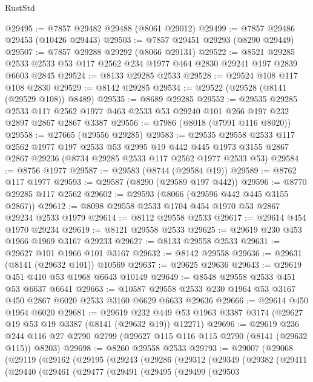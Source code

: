 \begin{lexlean}{RustStd}
\begin{coremodule}
@29495 := @7857 @29482 @29488 (@8061 @29012)
@29499 := @7857 @29486 @29453 (@10426 @29443)
@29503 := @7857 @29451 @29293 (@8290 @29449)
@29507 := @7857 @29288 @29292 (@8066 @29131)
@29522 := @8521
    @29285
    @2533
    @2533
    @53
    @117
    @2562
    @234
    @1977
    @464
    @2830
    @29241
    @197
    @2839
    @6603
    @2845
@29524 := @8133 @29285 @2533
@29528 := @29524 @108 @117 @108 @2830
@29529 := @8142 @29285
@29534 := @29522 (@29528 (@8141 (@29529 @108)) @8489)
@29535 := @8689 @29285
@29552 := @29535
    @29285
    @2533
    @117
    @2562
    @1977
    @463
    @2533
    @53
    @29240
    @101
    @266
    @197
    @232
    @2897
    @2867
    @2867
    @3387
@29556 := @7986 (@8018 (@7991 @116 @8020))
@29558 := @27665 (@29556 @29285)
@29583 := @29535
    @29558
    @2533
    @117
    @2562
    @1977
    @197
    @2533
    @53
    @2995
    @19
    @442
    @445
    @1973
    @3155
    @2867
    @2867
    @29236
    (@8734 @29285 @2533 @117 @2562 @1977 @2533 @53)
@29584 := @8756 @1977
@29587 := @29583 (@8744 (@29584 @19))
@29589 := @8762 @117 @1977
@29593 := @29587 (@8290 (@29589 @197 @442))
@29596 := @8770 @29285 @117 @2562
@29602 := @29593 (@8066 (@29596 @442 @445 @3155 @2867))
@29612 := @8098 @29558 @2533 @1704 @454 @1970 @53 @2867 @29234 @2533 @1979
@29614 := @8112 @29558 @2533
@29617 := @29614 @454 @1970 @29234
@29619 := @8121 @29558 @2533
@29625 := @29619 @230 @453 @1966 @1969 @3167 @29233
@29627 := @8133 @29558 @2533
@29631 := @29627 @101 @1966 @101 @3167
@29632 := @8142 @29558
@29636 := @29631 (@8141 (@29632 @101)) @10569
@29637 := @29625 @29636
@29643 := @29619 @451 @410 @53 @1968 @6643 @10149
@29649 := @8548 @29558 @2533 @451 @53 @6637 @6641
@29663 := @10587 @29558 @2533 @230 @1964 @53 @3167 @450 @2867 @6020 @2533 @3160 @6629 @6633 @29636
@29666 := @29614 @450 @1964 @6020
@29681 := @29619
    @232
    @449
    @53
    @1963
    @3387
    @3174
    (@29627 @19 @53 @19 @3387 (@8141 (@29632 @19)) @12271)
@29696 := @29619
    @236
    @244
    @116
    @27
    @2790
    @2799
    (@29627 @115 @116 @115 @2790 (@8141 (@29632 @115)) @8203)
@29698 := @8260 @29558 @2533
@29793 := @29007
    (@29068
      (@29119
        (@29162
          (@29195
            (@29243
              (@29286
                (@29312
                  (@29349
                    (@29382
                      (@29411
                        (@29440
                          (@29461
                            (@29477
                              (@29491
                                (@29495
                                  (@29499
                                    (@29503

\end{coremodule}
\end{lexlean}
